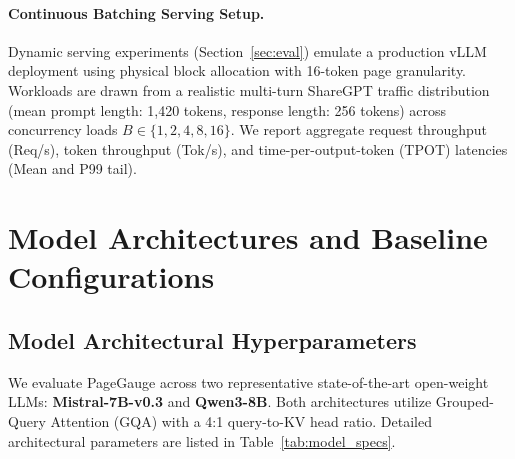 \documentclass{article}
\begin{document}
\paragraph{Continuous Batching Serving Setup.}
Dynamic serving experiments (Section~\ref{sec:eval}) emulate a production vLLM deployment \citep{kwon2023vllm} using physical block allocation with 16-token page granularity. Workloads are drawn from a realistic multi-turn ShareGPT traffic distribution (mean prompt length: 1,420 tokens, response length: 256 tokens) across concurrency loads $B \in \{1, 2, 4, 8, 16\}$. We report aggregate request throughput (Req/s), token throughput (Tok/s), and time-per-output-token (TPOT) latencies (Mean and P99 tail).

\section{Model Architectures and Baseline Configurations}
\label{app:models}

\subsection{Model Architectural Hyperparameters}
We evaluate PageGauge across two representative state-of-the-art open-weight LLMs: \textbf{Mistral-7B-v0.3} \citep{jiang2023mistral} and \textbf{Qwen3-8B}. Both architectures utilize Grouped-Query Attention (GQA) with a 4:1 query-to-KV head ratio. Detailed architectural parameters are listed in Table~\ref{tab:model_specs}.
\end{document}
